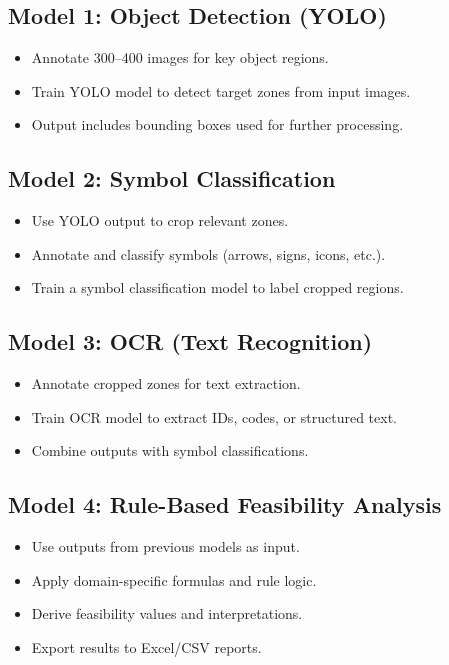 \documentclass{article}
\begin{document}
\subsection*{Model 1: Object Detection (YOLO)}
\begin{itemize}
    \item Annotate 300--400 images for key object regions.
    \item Train YOLO model to detect target zones from input images.
    \item Output includes bounding boxes used for further processing.
\end{itemize}

\subsection*{Model 2: Symbol Classification}
\begin{itemize}
    \item Use YOLO output to crop relevant zones.
    \item Annotate and classify symbols (arrows, signs, icons, etc.).
    \item Train a symbol classification model to label cropped regions.
\end{itemize}

\subsection*{Model 3: OCR (Text Recognition)}
\begin{itemize}
    \item Annotate cropped zones for text extraction.
    \item Train OCR model to extract IDs, codes, or structured text.
    \item Combine outputs with symbol classifications.
\end{itemize}

\subsection*{Model 4: Rule-Based Feasibility Analysis}
\begin{itemize}
    \item Use outputs from previous models as input.
    \item Apply domain-specific formulas and rule logic.
    \item Derive feasibility values and interpretations.
    \item Export results to Excel/CSV reports.
\end{itemize}
\end{document}
